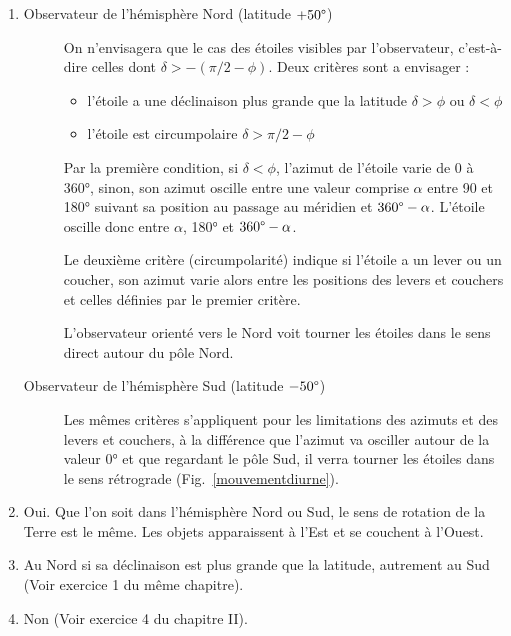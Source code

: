 \documentclass[a4paper,10pt]{report}
\renewcommand{\deg}{\ensuremath{\degree}}
\begin{document}
\begin{Answer}
  \begin{enumerate}
  \item
    \begin{description}
    \item[Observateur de l'hémisphère Nord (latitude $+50\deg$)] On
      n'envisagera que le cas des étoiles visibles par l'observateur,
      c'est-à-dire celles dont $\delta > -(\pi/2 - \phi)$. Deux
      critères sont a envisager :
      \begin{itemize}
      \item l'étoile a une déclinaison plus grande que la latitude
        $\delta>\phi$ ou $\delta<\phi$
      \item l'étoile est circumpolaire $\delta > \pi/2 - \phi$
      \end{itemize}
      Par la première condition, si $\delta<\phi$, l'azimut de
      l'étoile varie de 0 à 360°, sinon, son azimut oscille entre une
      valeur comprise $\alpha$ entre 90 et 180° suivant sa position au
      passage au méridien et $360\deg-\alpha$. L'étoile oscille donc
      entre $\alpha$, 180° et $360\deg-\alpha$.

      Le deuxième critère (circumpolarité) indique si l'étoile a un
      lever ou un coucher, son azimut varie alors entre les positions
      des levers et couchers et celles définies par le premier
      critère.

      L'observateur orienté vers le Nord voit tourner les étoiles dans
      le sens direct autour du pôle Nord.

    \item[Observateur de l'hémisphère Sud (latitude $-50\deg$)] Les
      mêmes critères s'appliquent pour les limitations des azimuts et
      des levers et couchers, à la différence que l'azimut va osciller
      autour de la valeur 0° et que regardant le pôle Sud, il verra
      tourner les étoiles dans le sens rétrograde
      (Fig.~\ref{mouvementdiurne}).
    \end{description}
  \item Oui. Que l'on soit dans l'hémisphère Nord ou Sud, le sens de
    rotation de la Terre est le même. Les objets apparaissent à l'Est
    et se couchent à l'Ouest.

  \item Au Nord si sa déclinaison est plus grande que la latitude,
    autrement au Sud (Voir exercice 1 du même chapitre).

  \item Non (Voir exercice 4 du chapitre II).
  \end{enumerate}
\end{Answer}
\end{document}
